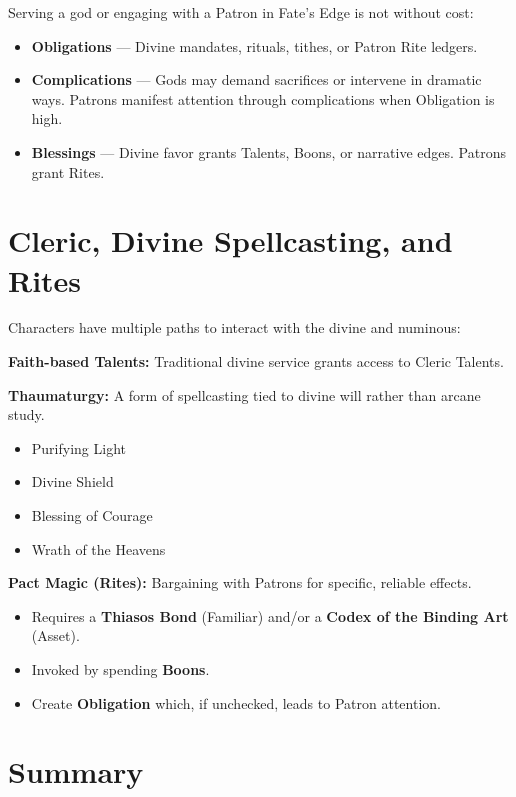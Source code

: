 Serving a god or engaging with a Patron in Fate's Edge is not without cost:

\begin{itemize}
  \item \textbf{Obligations} — Divine mandates, rituals, tithes, or Patron Rite ledgers.
  \item \textbf{Complications} — Gods may demand sacrifices or intervene in dramatic ways. Patrons manifest attention through complications when Obligation is high.
  \item \textbf{Blessings} — Divine favor grants Talents, Boons, or narrative edges. Patrons grant Rites.
\end{itemize}

\section{Cleric, Divine Spellcasting, and Rites}

Characters have multiple paths to interact with the divine and numinous:

\textbf{Faith-based Talents:} Traditional divine service grants access to Cleric Talents.

\textbf{Thaumaturgy:} A form of spellcasting tied to divine will rather than arcane study.
\begin{itemize}
  \item Purifying Light
  \item Divine Shield
  \item Blessing of Courage
  \item Wrath of the Heavens
\end{itemize}

\textbf{Pact Magic (Rites):} Bargaining with Patrons for specific, reliable effects.
\begin{itemize}
    \item Requires a \textbf{Thiasos Bond} (Familiar) and/or a \textbf{Codex of the Binding Art} (Asset).
    \item Invoked by spending \textbf{Boons}.
    \item Create \textbf{Obligation} which, if unchecked, leads to Patron attention.
\end{itemize}

\section{Summary}

